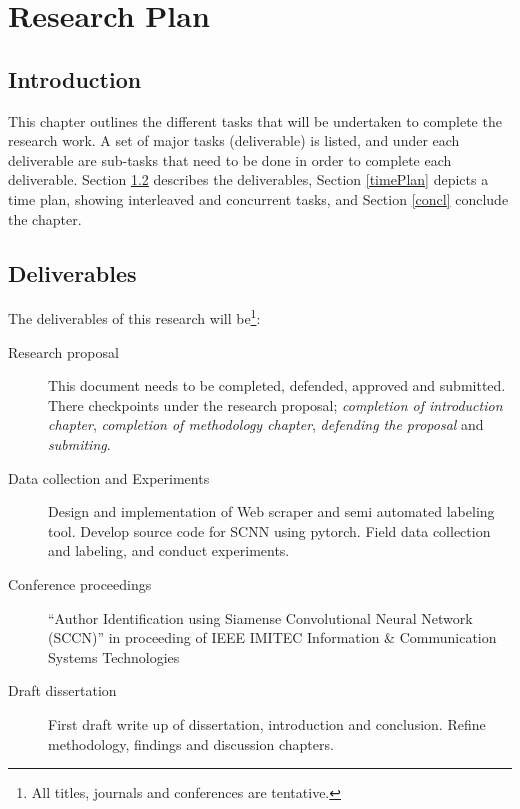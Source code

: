 %
%
%

\chapter{Research Plan}
\section{Introduction}
This chapter outlines the different tasks that will be undertaken to complete the research work. A set of major tasks (deliverable) is listed, and under each deliverable are sub-tasks that need to be done in order to complete each deliverable. Section \ref{deliverables} describes the deliverables, Section \ref{timePlan} depicts a time plan, showing interleaved and concurrent tasks, and Section \ref{concl} conclude the chapter.       

\section{Deliverables} \label{deliverables}

The deliverables of this research will be\footnote{All titles, journals and conferences are tentative.}:
\begin{description}
\item[Research proposal] This document needs to be completed, defended, approved and submitted. There checkpoints under the research proposal; \textit{completion of introduction chapter}, \textit{completion of methodology chapter}, \textit{defending the proposal} and \textit{submiting}. 
\item[Data collection and Experiments] Design and implementation of Web scraper and semi automated labeling tool. Develop source code for SCNN using pytorch. 
Field data collection and labeling, and conduct experiments.  
\item[Conference proceedings] ``Author Identification using Siamense Convolutional Neural Network (SCCN)'' in proceeding of IEEE IMITEC Information \& Communication Systems \/ Technologies 

\item[Draft dissertation] First draft write up of dissertation, introduction and conclusion. Refine methodology, findings and discussion chapters.

\end{description}

